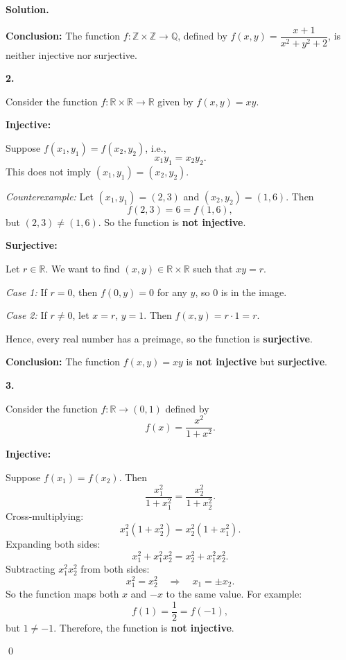 \documentclass[12pt]{article}
\newenvironment{solution}{%
	\par\medskip
	\noindent\textbf{Solution.}\par\nopagebreak
}{%
	\hfill \qed \par\medskip
}
\begin{document}
\begin{solution}
\medskip

\noindent\textbf{Conclusion:} The function \(f : \mathbb{Z} \times \mathbb{Z} \to \mathbb{Q}\), defined by \(f(x, y) = \dfrac{x + 1}{x^2 + y^2 + 2}\), is neither injective nor surjective.

\textbf{2.}

Consider the function \( f : \mathbb{R} \times \mathbb{R} \rightarrow \mathbb{R} \) given by \( f(x, y) = xy \).

\textbf{Injective:}

Suppose \( f(x_1, y_1) = f(x_2, y_2) \), i.e.,
\[
x_1 y_1 = x_2 y_2.
\]
This does not imply \( (x_1, y_1) = (x_2, y_2) \).

\textit{Counterexample:} Let \( (x_1, y_1) = (2, 3) \) and \( (x_2, y_2) = (1, 6) \). Then
\[
f(2, 3) = 6 = f(1, 6),
\]
but \( (2, 3) \neq (1, 6) \). So the function is \textbf{not injective}.

\textbf{Surjective:}

Let \( r \in \mathbb{R} \). We want to find \( (x, y) \in \mathbb{R} \times \mathbb{R} \) such that \( xy = r \).

\textit{Case 1:} If \( r = 0 \), then \( f(0, y) = 0 \) for any \( y \), so 0 is in the image.

\textit{Case 2:} If \( r \neq 0 \), let \( x = r \), \( y = 1 \). Then \( f(x, y) = r \cdot 1 = r \).

Hence, every real number has a preimage, so the function is \textbf{surjective}.

\medskip

\noindent\textbf{Conclusion:} The function \( f(x, y) = xy \) is \textbf{not injective} but \textbf{surjective}.

\bigskip

\textbf{3.}

Consider the function \( f : \mathbb{R} \rightarrow (0, 1) \) defined by
\[
f(x) = \frac{x^2}{1 + x^2}.
\]

\textbf{Injective:}

Suppose \( f(x_1) = f(x_2) \). Then
\[
\frac{x_1^2}{1 + x_1^2} = \frac{x_2^2}{1 + x_2^2}.
\]
Cross-multiplying:
\[
x_1^2 (1 + x_2^2) = x_2^2 (1 + x_1^2).
\]
Expanding both sides:
\[
x_1^2 + x_1^2 x_2^2 = x_2^2 + x_1^2 x_2^2.
\]
Subtracting \( x_1^2 x_2^2 \) from both sides:
\[
x_1^2 = x_2^2 \quad \Rightarrow \quad x_1 = \pm x_2.
\]
So the function maps both \( x \) and \( -x \) to the same value. For example:
\[
f(1) = \frac{1}{2} = f(-1),
\]
but \( 1 \neq -1 \). Therefore, the function is \textbf{not injective}.


\end{solution}
\end{document}
